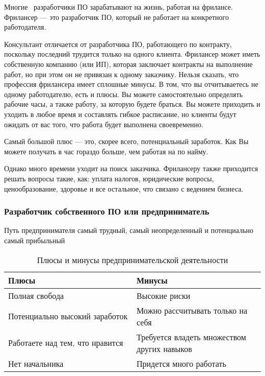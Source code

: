 \documentclass{../industrial-development}
\begin{document}
\lecturenotes

Многие~\cite[с.~62--67]{Sonmez} разработчики ПО зарабатывают на жизнь, работая на фрилансе. Фрилансер — это разработчик ПО, который не работает на конкретного работодателя.

 Консультант отличается от разработчика ПО, работающего по контракту, поскольку последний трудится только на одного клиента. Фрилансер может иметь собственную компанию (или ИП), которая заключает контракты на выполнение работ, но при этом он не привязан к одному заказчику.
Нельзя сказать, что профессия фрилансера имеет сплошные минусы. В том, что вы отчитываетесь не одному работодателю, есть и плюсы. Вы можете самостоятельно определять рабочие часы, а также работу, за которую будете браться. Вы можете приходить и уходить в любое время и составлять гибкое расписание, но клиенты будут ожидать от вас того, что работа будет выполнена своевременно.

Самый большой плюс — это, скорее всего, потенциальный заработок. Как Вы можете получать в час гораздо больше, чем работая на по найму. 

Однако много времени уходит на поиск заказчика. Фрилансеру также приходится решать вопросы такие, как: уплата налогов, юридические вопросы, ценообразование, здоровье и все остальное, что связано с ведением бизнеса.


\begin{frame} \frametitle{Разработчик собственного ПО или предприниматель}
  \begin{block}{}
 Путь предпринимателя самый трудный, самый неопределенный и потенциально самый прибыльный
  \end{block}
  
  \begin{table}[H]
\caption{\label{tab:canonsummary} Плюсы и минусы предпринимательской деятельности }
\begin{center}
\begin{tabular}{|p{0.5\linewidth}|p{0.5\linewidth}|}
\hline
\textbf{Плюсы} & \textbf{Минусы} \\
\hline
Полная свобода &  Высокие риски \\
\hline
Потенциально высокий заработок  & Можно рассчитывать только на себя \\
\hline
Работаете над тем, что нравится & Требуется владеть множеством других навыков \\
\hline
Нет начальника  & Придется много работать \\
\hline
\end{tabular}
\end{center}
\end{table} 

\end{frame}
\end{document}
